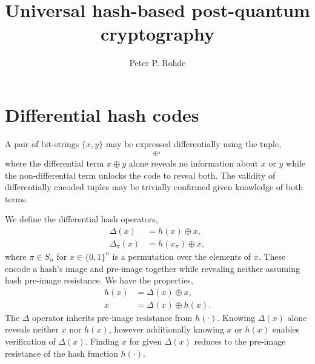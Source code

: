 \documentclass[twocolumn, aps, amsmath, amssymb, nofootinbib, superscriptaddress, longbibliography, doublefloatfix, table-of-contents, eqsecnum, rmp]{revtex4-2}
\begin{document}
\title{Universal hash-based post-quantum cryptography}

\author{Peter P. Rohde}

\begin{abstract}
\end{abstract}

\maketitle


\section{Differential hash codes}

A pair of bit-strings $\{x,y\}$ may be expressed differentially using the tuple,
\begin{align}
	[x,x\oplus y]_\oplus,
\end{align}
where the differential term $x\oplus y$ alone reveals no information about $x$ or $y$ while the non-differential term unlocks the code to reveal both. The validity of differentially encoded tuples may be trivially confirmed given knowledge of both terms.

We define the differential hash operators,
\begin{align}
	\Delta(x) &= h(x)\oplus x,\nonumber\\
	\Delta_\pi(x) &= h(x_\pi)\oplus x,
\end{align}
where $\pi\in S_n$ for $x\in\{0,1\}^n$ is a permutation over the elements of $x$. These encode a hash's image and pre-image together while revealing neither assuming hash pre-image resistance. We have the properties,
\begin{align}
	h(x) &= \Delta(x) \oplus x,\nonumber\\
	x &= \Delta(x) \oplus h(x).
\end{align}
The $\Delta$ operator inherits pre-image resistance from $h(\cdot)$. Knowing $\Delta(x)$ alone reveals neither $x$ nor $h(x)$, however additionally knowing $x$ or $h(x)$ enables verification of $\Delta(x)$. Finding $x$ for given $\Delta(x)$ reduces to the pre-image resistance of the hash function $h(\cdot)$.
\end{document}
